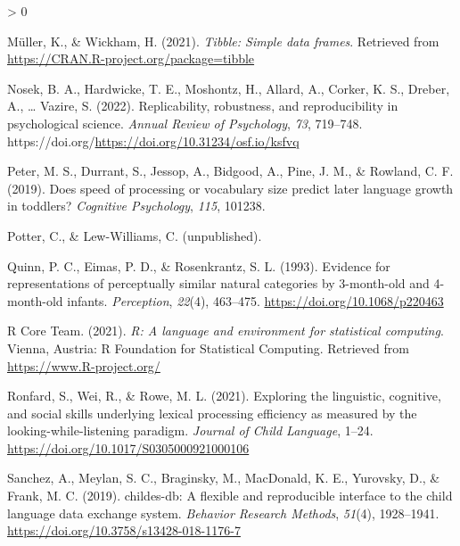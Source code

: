 \documentclass[
  english,
  man,floatsintext]{apa6}
\newlength{\cslhangindent}
\newenvironment{CSLReferences}[2] %
 {%
  \setlength{\parindent}{0pt}
  \ifodd #1 \everypar{\setlength{\hangindent}{\cslhangindent}}\ignorespaces\fi
  \ifnum #2 > 0
  \setlength{\parskip}{#2\baselineskip}
  \fi
 }%
 {}
\providecommand{\DIFaddtex}[1]{{\protect\color{blue}{#1}}} %
\providecommand{\DIFdeltex}[1]{}                      %
\providecommand{\DIFaddbegin}{} %
\providecommand{\DIFaddend}{} %
\providecommand{\DIFdelbegin}{} %
\providecommand{\DIFdelend}{} %
\providecommand{\DIFadd}[1]{\texorpdfstring{\DIFaddtex{#1}}{#1}} %
\providecommand{\DIFdel}[1]{\texorpdfstring{\DIFdeltex{#1}}{}} %
\newcommand{\DIFscaledelfig}{0.5}
\newlength{\DIFdelgraphicswidth} %
\newlength{\DIFdelgraphicsheight} %
\newcommand{\DIFaddincludegraphics}[2][]{{\color{blue}\fbox{\DIFOincludegraphics[#1]{#2}}}} %
\newcommand{\DIFdelincludegraphics}[2][]{%
\sbox{\DIFdelgraphicsbox}{\DIFOincludegraphics[#1]{#2}}%
\settoboxwidth{\DIFdelgraphicswidth}{\DIFdelgraphicsbox} %
\settoboxtotalheight{\DIFdelgraphicsheight}{\DIFdelgraphicsbox} %
\scalebox{\DIFscaledelfig}{%
\parbox[b]{\DIFdelgraphicswidth}{\usebox{\DIFdelgraphicsbox}\\[-\baselineskip] \rule{\DIFdelgraphicswidth}{0em}}\llap{\resizebox{\DIFdelgraphicswidth}{\DIFdelgraphicsheight}{%
\setlength{\unitlength}{\DIFdelgraphicswidth}%
\begin{picture}(1,1)%
\thicklines\linethickness{2pt} %
{\color[rgb]{1,0,0}\put(0,0){\framebox(1,1){}}}%
{\color[rgb]{1,0,0}\put(0,0){\line( 1,1){1}}}%
{\color[rgb]{1,0,0}\put(0,1){\line(1,-1){1}}}%
\end{picture}%
}\hspace*{3pt}}} %
} %
\DeclareRobustCommand{\DIFaddbegin}{\DIFOaddbegin \let\includegraphics\DIFaddincludegraphics} %
\DeclareRobustCommand{\DIFaddend}{\DIFOaddend \let\includegraphics\DIFOincludegraphics} %
\DeclareRobustCommand{\DIFdelbegin}{\DIFOdelbegin \let\includegraphics\DIFdelincludegraphics} %
\DeclareRobustCommand{\DIFdelend}{\DIFOaddend \let\includegraphics\DIFOincludegraphics} %
\begin{document}
\begin{CSLReferences}{1}{0}
\leavevmode\hypertarget{ref-R-tibble}{}%
Müller, K., \& Wickham, H. (2021). \emph{Tibble: Simple data frames}. Retrieved from \url{https://CRAN.R-project.org/package=tibble}

\leavevmode\hypertarget{ref-Nosek2021}{}%
Nosek, B. A., Hardwicke, T. E., Moshontz, H., Allard, A., Corker, K. S., Dreber, A., \ldots{} Vazire, S. (2022). {Replicability, robustness, and reproducibility in psychological science.} \emph{Annual Review of Psychology}, \emph{73}, 719--748. https://doi.org/\url{https://doi.org/10.31234/osf.io/ksfvq}

\leavevmode\hypertarget{ref-peter2019}{}%
Peter, M. S., Durrant, S., Jessop, A., Bidgood, A., Pine, J. M., \& Rowland, C. F. (2019). Does speed of processing or vocabulary size predict later language growth in toddlers? \emph{Cognitive Psychology}, \emph{115}, 101238.

\leavevmode\hypertarget{ref-PotterLewWilliamsUnpub}{}%
Potter, C., \& Lew-Williams, C. (unpublished). \DIFdelbegin \emph{%
\DIFdel{Behold the canine!: How does toddlers' knowledge of typical frames and familiar words interact to influence their sentence processing?}%
}
\DIFdelend \DIFaddbegin {\DIFadd{Behold the canine!: How does toddlers' knowledge of typical frames and familiar words interact to influence their sentence processing?}}
\DIFaddend 

\leavevmode\hypertarget{ref-Quinn1993}{}%
Quinn, P. C., Eimas, P. D., \& Rosenkrantz, S. L. (1993). {Evidence for representations of perceptually similar natural categories by 3-month-old and 4-month-old infants}. \emph{Perception}, \emph{22}(4), 463--475. \url{https://doi.org/10.1068/p220463}

\leavevmode\hypertarget{ref-R-base}{}%
R Core Team. (2021). \emph{R: A language and environment for statistical computing}. Vienna, Austria: R Foundation for Statistical Computing. Retrieved from \url{https://www.R-project.org/}

\leavevmode\hypertarget{ref-Ronfard2021}{}%
Ronfard, S., Wei, R., \& Rowe, M. L. (2021). Exploring the linguistic, cognitive, and social skills underlying lexical processing efficiency as measured by the looking-while-listening paradigm. \emph{Journal of Child Language}, 1--24. \url{https://doi.org/10.1017/S0305000921000106}

\leavevmode\hypertarget{ref-Sanchez2019}{}%
Sanchez, A., Meylan, S. C., Braginsky, M., MacDonald, K. E., Yurovsky, D., \& Frank, M. C. (2019). {childes-db: A flexible and reproducible interface to the child language data exchange system}. \emph{Behavior Research Methods}, \emph{51}(4), 1928--1941. \url{https://doi.org/10.3758/s13428-018-1176-7}


\end{CSLReferences}
\end{document}
